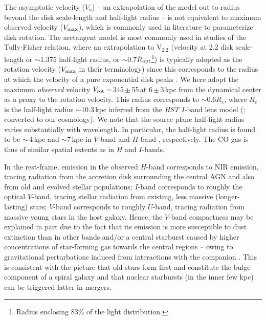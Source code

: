 \documentclass[]{emulateapj}
\begin{document}
The asymptotic velocity ($V_{a}$) -- an extrapolation of the model
out to radius beyond the disk scale-length and half-light radius --
is not equivalent to maximum observed velocity ($V_{\rm max}$),
which is commonly used in literature to parameterize disk rotation.
The arctangent model is most commonly used in studies of the
Tully-Fisher relation, where an extrapolation to V$_{2.2}$ (velocity
at 2.2 disk scale-length or $\sim$1.375 half-light radius,
or $\sim$0.7$R_{\rm opt}$\footnote{Radius enclosing 83\% of the light
distribution.}) is typically adopted
as the rotation velocity ($V_{\rm max}$ in their
terminology) since this corresponds to the radius at which the velocity
of a pure exponential disk peaks \citep{Courteau97b}.
We here adopt the maximum {\em observed} velocity
$V_{\rm rot}$\,=\,345\,$\pm$\,55\,\kms at 6\,$\pm$\,3\,kpc from the %
dynamical center as a proxy to the rotation velocity.
This radius corresponds to $\sim$0.6$R_e$, where $R_e$ is the half-light
radius $\sim$10.3\,kpc inferred from the {\it HST} $I$-band
lens model (; converted to
our cosmology).
We note that the source plane half-light radius varies substantially with
wavelength. In particular, the half-light radius is found to be
$\sim$\,4\,kpc and $\sim$7\,kpc in $V$-band
 and $H$-band , respectively.
The CO gas is thus of similar spatial
extents as in $H$ and $I$-bands.

In the rest-frame,
emission in the observed $H$-band corresponds to NIR emission,
tracing radiation from the accretion disk surrounding
the central AGN and also from old and evolved stellar populations;
$I$-band corresponds to roughly the optical $V$-band, tracing stellar radiation from
existing, less massive (\ie longer-lasting) stars;
$V$-band corresponds to roughly $U$-band,  tracing radiation from massive young stars
in the host galaxy. Hence,
the $V$-band compactness may be explained in part
due to the fact that its emission is
more susceptible to dust extinction than in other bands and/or
a central starburst caused by higher
concentrations of star-forming gas towards the central regions -- owing to
gravitational perturbations induced
from interactions with the companion
\citep[\eg][]{DiMatteo05a}.
This is consistent with the picture that old stars form first and constitute the bulge component
of a spiral galaxy and that nuclear starbursts (in the inner few kpc) can be triggered latter in mergers.
\end{document}
